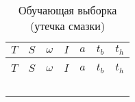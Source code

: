 \begin{longtable}[H]{|C{100pt}|C{80pt}|C{50pt}|C{50pt}|C{50pt}|C{50pt}|C{50pt}|}
\caption{Обучающая выборка (утечка смазки)}
\label{app:Data:LubricationStarvation}
\\ \hline
$T$ & $S$ & $\omega$ & $I$ & $a$ & $t_b$ & $t_h$ \\\hline
\endfirsthead
{}
\\ \hline
$T$ & $S$ & $\omega$ & $I$ & $a$ & $t_b$ & $t_h$ \\\hline
\endhead
{}
\end{longtable}
